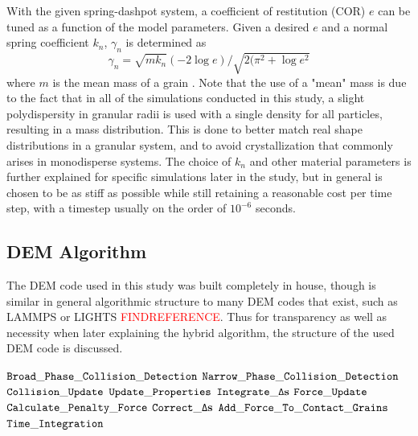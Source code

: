 With the given spring-dashpot system, a coefficient of restitution (COR) $e$ can be tuned as a function of the model parameters. Given a desired $e$ and a normal spring coefficient $k_n$, $\gamma_n$ is determined as
$$\gamma_n=\sqrt{mk_n}(-2\log{e})/\sqrt{2(\pi^2+\log{e}^2}$$
where $m$ is the mean mass of a grain \cite{Kamrin:2014}. Note that the use of a "mean" mass is due to the fact that in all of the simulations conducted in this study, a slight polydispersity in granular radii is used with a single density for all particles, resulting in a mass distribution. This is done to better match real shape distributions in a granular system, and to avoid crystallization that commonly arises in monodisperse systems. The choice of $k_n$ and other material parameters is further explained for specific simulations later in the study, but in general is chosen to be as stiff as possible while still retaining a reasonable cost per time step, with a timestep usually on the order of $10^{-6}$ seconds.

\subsection{DEM Algorithm}
The DEM code used in this study was built completely in house, though is similar in general algorithmic structure to many DEM codes that exist, such as LAMMPS or LIGHTS \textcolor{red}{FINDREFERENCE}. Thus for transparency as well as necessity when later explaining the hybrid algorithm, the structure of the used DEM code is discussed.

\begin{algorithm}
  \caption{${\tt Overall \_ DEM \_ Algorithm}$}
  \begin{algorithmic}[1]
  \State ${\tt Broad\_Phase\_Collision\_Detection}$
    \State ${\tt Narrow\_Phase\_Collision\_Detection}$
  \EndFor
  \State ${\tt Collision\_Update}$
    \State ${\tt Update\_Properties}$
    \State ${\tt Integrate\_\Delta\bold{s}}$
  \EndFor
  \State ${\tt Force\_Update}$ 
    \State ${\tt Calculate\_Penalty\_Force}$
    \State ${\tt Correct\_\Delta\bold{s}}$
    \State ${\tt Add\_Force\_To\_Contact\_Grains}$
  \EndFor
  \State ${\tt Time\_Integration}$ 
  \end{algorithmic}
  \label{alg:DEM_algorithm}
\end{algorithm}

